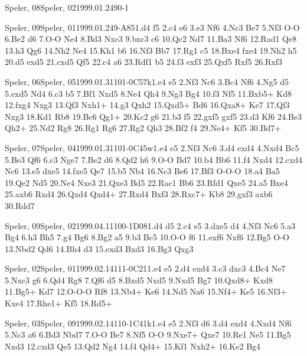 \documentclass[twocolumn,a4paper,10pt]{report}
\begin{document}
\begin{chessempty}{Speler, 08}{Speler, 02}{1999.01.24}{9}{0-1}{}\end{chessempty}
\begin{chessgame}{Speler, 09}{Speler, 01}{1999.01.24}{9}{\textonehalf-\textonehalf}{A85}{1.d4 f5 2.c4 e6 3.e3 Nf6 4.Nc3 Be7 5.Nf3 O-O 6.Be2 d6 7.O-O Ne4 8.Bd3 Nxc3 9.bxc3 c6 10.Qc2 Nd7 11.Ba3 Nf6 12.Rad1 Qe8 13.h3 Qg6 14.Nh2 Ne4 15.Kh1 b6 16.Nf3 Bb7 17.Rg1 c5 18.Bxe4 fxe4 19.Nh2 h5 20.d5 exd5 21.cxd5 Qf5 22.c4 a6 23.Rdf1 b5 24.f3 exf3 25.Qxf5 Rxf5 26.Rxf3}\end{chessgame}
\begin{chessgame}{Speler, 06}{Speler, 05}{1999.01.31}{10}{1-0}{C57k}{1.e4 e5 2.Nf3 Nc6 3.Bc4 Nf6 4.Ng5 d5 5.exd5 Nd4 6.c3 b5 7.Bf1 Nxd5 8.Ne4 Qh4 9.Ng3 Bg4 10.f3 Nf5 11.Bxb5+ Kd8 12.fxg4 Nxg3 13.Qf3 Nxh1+ 14.g3 Qxh2 15.Qxd5+ Bd6 16.Qxa8+ Ke7 17.Qf3 Nxg3 18.Kd1 Rb8 19.Bc6 Qg1+ 20.Kc2 g6 21.b3 f5 22.gxf5 gxf5 23.d3 Kf6 24.Be3 Qh2+ 25.Nd2 Rg8 26.Rg1 Rg6 27.Rg2 Qh3 28.Bf2 f4 29.Ne4+ Kf5 30.Bd7+}\end{chessgame}
\begin{chessgame}{Speler, 07}{Speler, 04}{1999.01.31}{10}{1-0}{C45w}{1.e4 e5 2.Nf3 Nc6 3.d4 exd4 4.Nxd4 Bc5 5.Be3 Qf6 6.c3 Nge7 7.Be2 d6 8.Qd2 h6 9.O-O Bd7 10.b4 Bb6 11.f4 Nxd4 12.cxd4 Nc6 13.e5 dxe5 14.fxe5 Qe7 15.b5 Nb4 16.Nc3 Be6 17.Bf3 O-O-O 18.a4 Ba5 19.Qe2 Nd5 20.Ne4 Nxe3 21.Qxe3 Bd5 22.Rac1 Bb6 23.Rfd1 Qxe5 24.a5 Bxe4 25.axb6 Rxd4 26.Qxd4 Qxd4+ 27.Rxd4 Bxf3 28.Rxc7+ Kb8 29.gxf3 axb6 30.Rdd7}\end{chessgame}
\begin{chessgame}{Speler, 09}{Speler, 02}{1999.04.11}{10}{0-1}{D08}{1.d4 d5 2.c4 e5 3.dxe5 d4 4.Nf3 Nc6 5.a3 Bg4 6.h3 Bh5 7.g4 Bg6 8.Bg2 a5 9.b3 Bc5 10.O-O f6 11.exf6 Nxf6 12.Bg5 O-O 13.Nbd2 Qd6 14.Bh4 d3 15.exd3 Bxd3 16.Bg3 Qxg3}\end{chessgame}
\begin{chessgame}{Speler, 02}{Speler, 01}{1999.02.14}{11}{1-0}{C21}{1.e4 e5 2.d4 exd4 3.c3 dxc3 4.Bc4 Ne7 5.Nxc3 g6 6.Qd4 Rg8 7.Qf6 d5 8.Bxd5 Nxd5 9.Nxd5 Bg7 10.Qxd8+ Kxd8 11.Bg5+ Kd7 12.O-O-O Rf8 13.Nb4+ Ke6 14.Nd5 Na6 15.Nf4+ Ke5 16.Nf3+ Kxe4 17.Rhe1+ Kf5 18.Rd5+}\end{chessgame}
\begin{chessgame}{Speler, 03}{Speler, 09}{1999.02.14}{11}{0-1}{C41k}{1.e4 e5 2.Nf3 d6 3.d4 exd4 4.Nxd4 Nf6 5.Nc3 a6 6.Bd3 Nbd7 7.O-O Be7 8.Nf5 O-O 9.Nxe7+ Qxe7 10.Re1 Ne5 11.Bg5 Nxd3 12.cxd3 Qe5 13.Qd2 Ng4 14.f4 Qd4+ 15.Kf1 Nxh2+ 16.Ke2 Bg4\mate}\end{chessgame}
\end{document}
